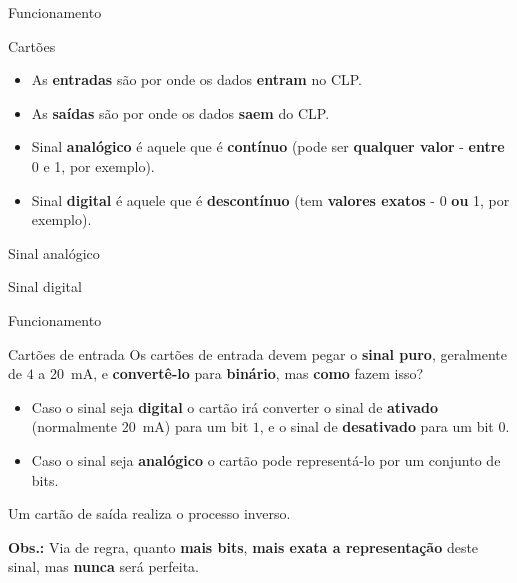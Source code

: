\begin{frame}{Funcionamento}
	\begin{block}{Cartões}
		\begin{itemize}
			\item As \textbf{entradas} são por onde os dados \textbf{entram} no CLP.
			\item As \textbf{saídas} são por onde os dados \textbf{saem} do CLP.
			\item Sinal \textbf{analógico} é aquele que é \textbf{contínuo} (pode ser \textbf{qualquer valor} - \textbf{entre} 0 e 1, por exemplo).
			\item Sinal \textbf{digital} é aquele que é \textbf{descontínuo} (tem \textbf{valores exatos} - 0 \textbf{ou} 1, por exemplo).
		\end{itemize}
	\end{block}
	
	\begin{minipage}{0.48\linewidth}
		\centering
		
		\scalebox{0.45}{}
		
		Sinal analógico
	\end{minipage}
	\hfill
	\begin{minipage}{0.48\linewidth}
		\centering
		
		\scalebox{0.45}{}
		
		Sinal digital
	\end{minipage}
\end{frame}


\begin{frame}{Funcionamento}
	\begin{block}{Cartões de entrada}
		Os cartões de entrada devem pegar o \textbf{sinal puro}, geralmente de $ 4 $ a \SI{20}{\milli\ampere}, e \textbf{convertê-lo} para \textbf{binário}, mas \textbf{como} fazem isso?
		\begin{itemize}
			\item Caso o sinal seja \textbf{digital} o cartão irá converter o sinal de \textbf{ativado} (normalmente \SI{20}{\milli\ampere}) para um bit $ 1 $, e o sinal de \textbf{desativado} para um bit $ 0 $.
			\item Caso o sinal seja \textbf{analógico} o cartão pode representá-lo por um conjunto de bits.
		\end{itemize}
	
		Um cartão de saída realiza o processo inverso.
		
		\medskip
	
		\textbf{Obs.:} Via de regra, quanto \textbf{mais bits}, \textbf{mais exata a representação} deste sinal, mas \textbf{nunca} será perfeita.
	\end{block}
\end{frame}



